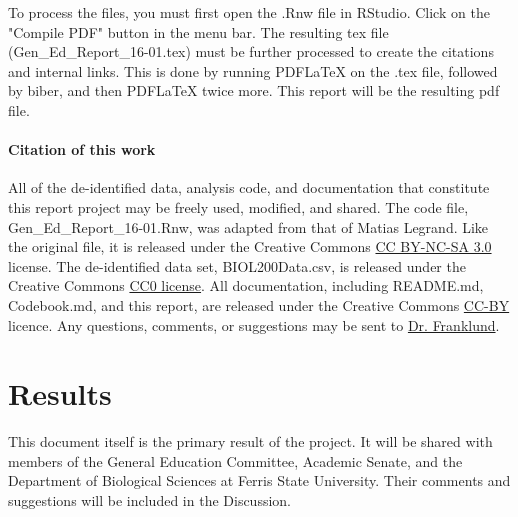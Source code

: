 \documentclass[fleqn,10pt]{SelfArx}\usepackage[]{graphicx}\usepackage[]{color}
\begin{document}
To process the files, you must first open the .Rnw file in RStudio. Click on the "Compile PDF" button in the menu bar. The resulting tex file (Gen\_Ed\_Report\_16-01.tex) must be further processed to create the citations and internal links. This is done by running PDFLaTeX on the .tex file, followed by biber, and then PDFLaTeX twice more. This report will be the resulting pdf file.

\paragraph{Citation of this work}
All of the de-identified data, analysis code, and documentation that constitute this report project may be freely used, modified, and shared. The code file, Gen\_Ed\_Report\_16-01.Rnw, was adapted from that of Matias Legrand. Like the original file, it is released under the Creative Commons \href{http://creativecommons.org/licenses/by-nc-sa/3.0/}{CC BY-NC-SA 3.0} license. The de-identified data set, BIOL200Data.csv, is released under the Creative Commons \href{https://creativecommons.org/publicdomain/zero/1.0/}{CC0 license}. All documentation, including README.md, Codebook.md, and this report, are released under the Creative Commons \href{https://creativecommons.org/licenses/by/4.0/}{CC-BY} licence. Any questions, comments, or suggestions may be sent to \href{mailto:CliftonFranklund@ferris.edu}{Dr. Franklund}.


\section{Results}
This document itself is the primary result of the project. It will be shared with members of the General Education Committee, Academic Senate, and the Department of Biological Sciences at Ferris State University. Their comments and suggestions will be included in the Discussion.

\end{document}
